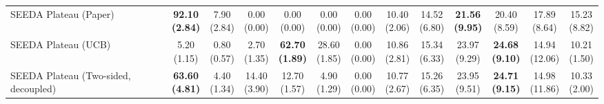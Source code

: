\begin{table}[H]
{\begin{tabular}{l|cccccc|cccccc}
SEEDA Plateau (Paper) & \bfseries \makecell{92.10 \\ (2.84)} & \makecell{7.90 \\ (2.84)} & {\cellcolor[HTML]{C8E6C9}} \makecell{0.00 \\ (0.00)} & \makecell{0.00 \\ (0.00)} & \makecell{0.00 \\ (0.00)} & \makecell{0.00 \\ (0.00)} & \makecell{10.40 \\ (2.06)} & \makecell{14.52 \\ (6.80)} & {\cellcolor[HTML]{C8E6C9}} \bfseries \makecell{21.56 \\ (9.95)} & \makecell{20.40 \\ (8.59)} & \makecell{17.89 \\ (8.64)} & \makecell{15.23 \\ (8.82)} \\
SEEDA Plateau (UCB) & \makecell{5.20 \\ (1.15)} & \makecell{0.80 \\ (0.57)} & {\cellcolor[HTML]{C8E6C9}} \makecell{2.70 \\ (1.35)} & \bfseries \makecell{62.70 \\ (1.89)} & \makecell{28.60 \\ (1.85)} & \makecell{0.00 \\ (0.00)} & \makecell{10.86 \\ (2.81)} & \makecell{15.34 \\ (6.33)} & {\cellcolor[HTML]{C8E6C9}} \makecell{23.97 \\ (9.29)} & \bfseries \makecell{24.68 \\ (9.10)} & \makecell{14.94 \\ (12.06)} & \makecell{10.21 \\ (1.50)} \\
SEEDA Plateau (Two-sided, decoupled) & \bfseries \makecell{63.60 \\ (4.81)} & \makecell{4.40 \\ (1.34)} & {\cellcolor[HTML]{C8E6C9}} \makecell{14.40 \\ (3.90)} & \makecell{12.70 \\ (1.57)} & \makecell{4.90 \\ (1.29)} & \makecell{0.00 \\ (0.00)} & \makecell{10.77 \\ (2.67)} & \makecell{15.26 \\ (6.35)} & {\cellcolor[HTML]{C8E6C9}} \makecell{23.95 \\ (9.51)} & \bfseries \makecell{24.71 \\ (9.15)} & \makecell{14.98 \\ (11.86)} & \makecell{10.33 \\ (2.00)} \\

\end{tabular}}
\end{table}
